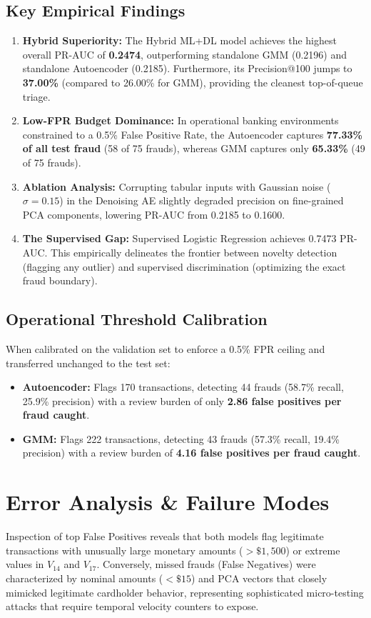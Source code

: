 \documentclass[conference]{IEEEtran}
\begin{document}
\subsection{Key Empirical Findings}
\begin{enumerate}
    \item \textbf{Hybrid Superiority:} The Hybrid ML+DL model achieves the highest overall PR-AUC of \textbf{0.2474}, outperforming standalone GMM (0.2196) and standalone Autoencoder (0.2185). Furthermore, its Precision@100 jumps to \textbf{37.00\%} (compared to 26.00\% for GMM), providing the cleanest top-of-queue triage.
    \item \textbf{Low-FPR Budget Dominance:} In operational banking environments constrained to a 0.5\% False Positive Rate, the Autoencoder captures \textbf{77.33\% of all test fraud} (58 of 75 frauds), whereas GMM captures only \textbf{65.33\%} (49 of 75 frauds).
    \item \textbf{Ablation Analysis:} Corrupting tabular inputs with Gaussian noise ($\sigma = 0.15$) in the Denoising AE slightly degraded precision on fine-grained PCA components, lowering PR-AUC from 0.2185 to 0.1600.
    \item \textbf{The Supervised Gap:} Supervised Logistic Regression achieves 0.7473 PR-AUC. This empirically delineates the frontier between novelty detection (flagging any outlier) and supervised discrimination (optimizing the exact fraud boundary).
\end{enumerate}

\subsection{Operational Threshold Calibration}
When calibrated on the validation set to enforce a 0.5\% FPR ceiling and transferred unchanged to the test set:
\begin{itemize}
    \item \textbf{Autoencoder:} Flags 170 transactions, detecting 44 frauds (58.7\% recall, 25.9\% precision) with a review burden of only \textbf{2.86 false positives per fraud caught}.
    \item \textbf{GMM:} Flags 222 transactions, detecting 43 frauds (57.3\% recall, 19.4\% precision) with a review burden of \textbf{4.16 false positives per fraud caught}.
\end{itemize}

\section{Error Analysis \& Failure Modes}
Inspection of top False Positives reveals that both models flag legitimate transactions with unusually large monetary amounts ($>\$1,500$) or extreme values in $V_{14}$ and $V_{17}$. Conversely, missed frauds (False Negatives) were characterized by nominal amounts ($<\$15$) and PCA vectors that closely mimicked legitimate cardholder behavior, representing sophisticated micro-testing attacks that require temporal velocity counters to expose.
\end{document}
